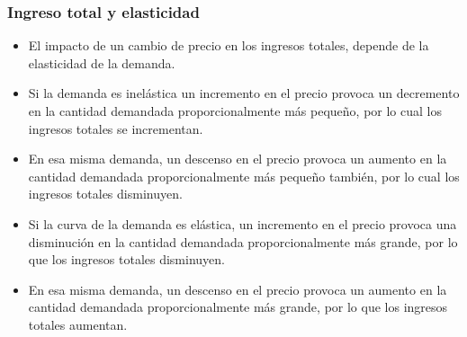 \documentclass{beamer}
\begin{document}


\begin{frame}
\frametitle{Ingreso total y elasticidad}
\begin{itemize}
    \item El impacto de un cambio de precio en los ingresos totales, depende de la elasticidad de la demanda.
    \item Si la demanda es inelástica un incremento en el precio provoca un decremento en la cantidad demandada proporcionalmente más pequeño, por lo cual los ingresos totales se incrementan.
    \item En esa misma demanda, un descenso en el precio provoca un aumento en la cantidad demandada proporcionalmente más pequeño también, por lo cual los ingresos totales disminuyen.
    \item Si la curva de la demanda es elástica, un incremento en el precio provoca una disminución en la cantidad demandada proporcionalmente más grande, por lo que los ingresos totales disminuyen.
    \item En esa misma demanda, un descenso en el precio provoca un aumento en la cantidad demandada proporcionalmente más grande, por lo que los ingresos totales aumentan.
\end{itemize}
\end{frame}
\end{document}
